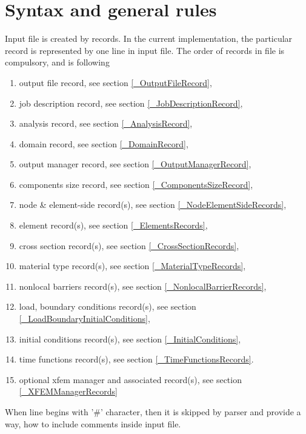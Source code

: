 \documentclass[a4paper]{article}
\begin{document}
\section{Syntax and general rules}

Input file is created by records. In the current implementation, the
particular record is represented by one line in input file.
The order of records in file is
compulsory, and is following
\begin{enumerate}
\item output file record, see section \ref{_OutputFileRecord},
\item job description record, see section \ref{_JobDescriptionRecord},
\item analysis record, see section \ref{_AnalysisRecord},
\item domain record, see section \ref{_DomainRecord},
\item output manager record, see section \ref{_OutputManagerRecord},
\item components size record, see section \ref{_ComponentsSizeRecord},
\item node \& element-side  record(s), see section \ref{_NodeElementSideRecords},
\item element record(s), see section \ref{_ElementsRecords},
\item cross section record(s), see section \ref{_CrossSectionRecords},
\item material type  record(s), see section \ref{_MaterialTypeRecords},
\item nonlocal barriers record(s), see section \ref{_NonlocalBarrierRecords},
\item load, boundary  conditions record(s), see section
  \ref{_LoadBoundaryInitialConditions},
\item initial conditions record(s), see section \ref{_InitialConditions},
\item time functions record(s), see section \ref{_TimeFunctionsRecords}.
\item optional xfem manager and associated record(s), see section \ref{_XFEMManagerRecords}
\end{enumerate}
When line begins with '\#' character, then it is skipped by parser and
provide a way, how to include comments inside input file.
\end{document}
